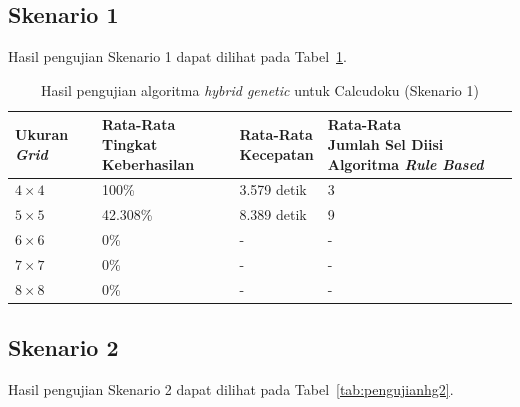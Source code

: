 \subsection{Skenario 1}
\label{sec:skenario1}

Hasil pengujian Skenario 1 dapat dilihat pada Tabel~\ref{tab:pengujianhg1}.

\begin{table}
\centering
\captionsetup{justification=centering}
\caption[Hasil pengujian algoritma \textit{hybrid genetic} untuk Calcudoku (Skenario 1)]{Hasil pengujian algoritma \textit{hybrid genetic} untuk Calcudoku (Skenario 1)}
\begin{tabular}{| l | l | l | l |}
\hline
Ukuran \textit{Grid} & \makecell[l]{Rata-Rata \\ Tingkat Keberhasilan} & \makecell[l]{Rata-Rata \\ Kecepatan} & \makecell[l]{Rata-Rata \\ Jumlah Sel Diisi Algoritma \textit{Rule Based}} \\
\hline \hline
\begin{math}4 \times 4\end{math} & 100\% & 3.579 detik & 3 \\
\hline
\begin{math}5 \times 5\end{math} & 42.308\% & 8.389 detik & 9 \\
\hline
\begin{math}6 \times 6\end{math} & 0\% & - & - \\
\hline
\begin{math}7 \times 7\end{math} & 0\% & - & - \\
\hline
\begin{math}8 \times 8\end{math} & 0\% & - & - \\
\hline
\end{tabular}
\label{tab:pengujianhg1}
\end{table}

\clearpage

\subsection{Skenario 2}
\label{sec:skenario2}

Hasil pengujian Skenario 2 dapat dilihat pada Tabel~\ref{tab:pengujianhg2}.

